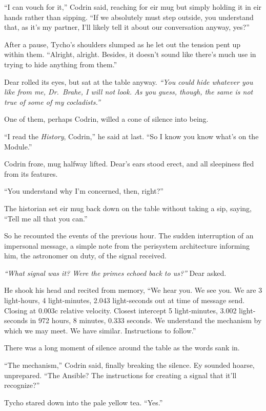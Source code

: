 ``I can vouch for it,'' Codrin said, reaching for eir mug but simply holding it in eir hands rather than sipping. ``If we absolutely must step outside, you understand that, as it's my partner, I'll likely tell it about our conversation anyway, yes?''

After a pause, Tycho's shoulders slumped as he let out the tension pent up within them. ``Alright, alright. Besides, it doesn't sound like there's much use in trying to hide anything from them.''

Dear rolled its eyes, but sat at the table anyway. \emph{``You could hide whatever you like from me, Dr.~Brahe, I will not look. As you guess, though, the same is not true of some of my cocladists.''}

One of them, perhaps Codrin, willed a cone of silence into being.

``I read the \emph{History}, Codrin,'' he said at last. ``So I know you know what's on the Module.''

Codrin froze, mug halfway lifted. Dear's ears stood erect, and all sleepiness fled from its features.

``You understand why I'm concerned, then, right?''

The historian set eir mug back down on the table without taking a sip, saying, ``Tell me all that you can.''

So he recounted the events of the previous hour. The sudden interruption of an impersonal message, a simple note from the perisystem architecture informing him, the astronomer on duty, of the signal received.

\emph{``What signal was it? Were the primes echoed back to us?''} Dear asked.

He shook his head and recited from memory, ``We hear you. We see you. We are 3 light-hours, 4 light-minutes, 2.043 light-seconds out at time of message send. Closing at 0.003c relative velocity. Closest intercept 5 light-minutes, 3.002 light-seconds in 972 hours, 8 minutes, 0.333 seconds. We understand the mechanism by which we may meet. We have similar. Instructions to follow.''

There was a long moment of silence around the table as the words sank in.

``The mechanism,'' Codrin said, finally breaking the silence. Ey sounded hoarse, unprepared. ``The Ansible? The instructions for creating a signal that it'll recognize?''

Tycho stared down into the pale yellow tea. ``Yes.''

